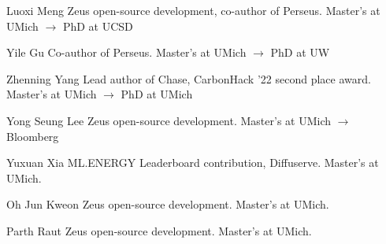 

\begin{cvlist}

  \cvlistitem
    {Luoxi Meng}
    {Zeus open-source development, co-author of Perseus. Master's at UMich $\rightarrow$ PhD at UCSD}

  \cvlistitem
    {Yile Gu}
    {Co-author of Perseus. Master's at UMich $\rightarrow$ PhD at UW}

  \cvlistitem
    {Zhenning Yang}
    {Lead author of Chase, CarbonHack '22 second place award. Master's at UMich $\rightarrow$ PhD at UMich}

  \cvlistitem
    {Yong Seung Lee}
    {Zeus open-source development. Master's at UMich $\rightarrow$ Bloomberg}

  \cvlistitem
    {Yuxuan Xia}
    {ML.ENERGY Leaderboard contribution, Diffuserve. Master's at UMich.}

  \cvlistitem
    {Oh Jun Kweon}
    {Zeus open-source development. Master's at UMich.}

  \cvlistitem
    {Parth Raut}
    {Zeus open-source development. Master's at UMich.}

\end{cvlist}
